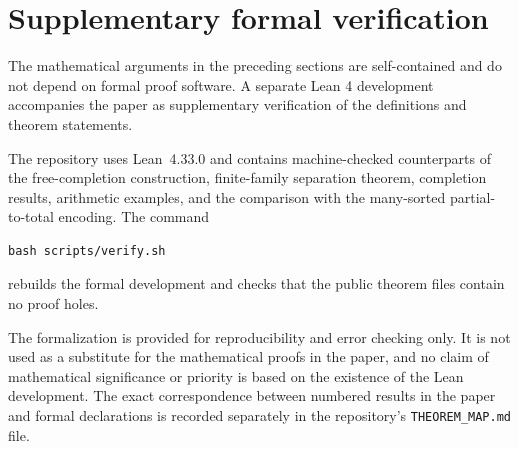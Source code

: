 \section{Supplementary formal verification}\label{app:formalization}

The mathematical arguments in the preceding sections are self-contained and do
not depend on formal proof software.  A separate Lean 4 development accompanies
the paper as supplementary verification of the definitions and theorem
statements.

The repository uses Lean~4.33.0 and contains machine-checked counterparts of
the free-completion construction, finite-family separation theorem, completion
results, arithmetic examples, and the comparison with the many-sorted
partial-to-total encoding.  The command
\begin{lstlisting}[style=lean]
bash scripts/verify.sh
\end{lstlisting}
rebuilds the formal development and checks that the public theorem files contain
no proof holes.

The formalization is provided for reproducibility and error checking only.  It
is not used as a substitute for the mathematical proofs in the paper, and no
claim of mathematical significance or priority is based on the existence of the
Lean development.  The exact correspondence between numbered results in the
paper and formal declarations is recorded separately in the repository's
\texttt{THEOREM\_MAP.md} file.
